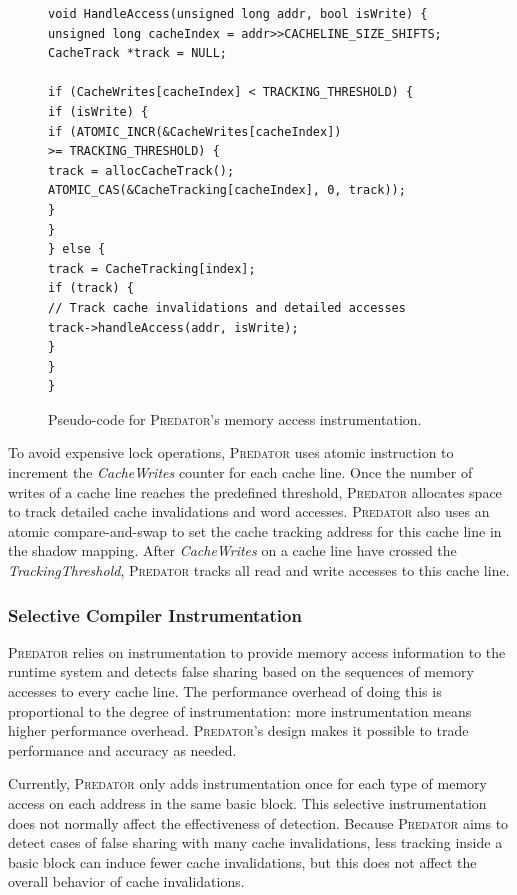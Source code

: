 \documentclass[10pt]{sigplanconf}
\newcommand{\Predator}{{\scshape Predator}}
\begin{document}
\begin{figure}[!t]
\begin{lstlisting}
void HandleAccess(unsigned long addr, bool isWrite) {
unsigned long cacheIndex = addr>>CACHELINE_SIZE_SHIFTS;
CacheTrack *track = NULL;

if (CacheWrites[cacheIndex] < TRACKING_THRESHOLD) {
if (isWrite) {
if (ATOMIC_INCR(&CacheWrites[cacheIndex]) 
>= TRACKING_THRESHOLD) {
track = allocCacheTrack();
ATOMIC_CAS(&CacheTracking[cacheIndex], 0, track));
}
} 
} else {
track = CacheTracking[index];
if (track) {
// Track cache invalidations and detailed accesses
track->handleAccess(addr, isWrite);
}
}
}
\end{lstlisting}
\caption{Pseudo-code for \Predator{}'s memory access instrumentation.\label{fig:algorithm}}
\end{figure}

To avoid expensive lock operations, \Predator{} uses atomic instruction to increment 
the {\it CacheWrites} counter for each cache line. 
Once the number of writes of a cache line reaches the predefined threshold,
\Predator{} allocates space to track detailed cache invalidations and word accesses.
\Predator{} also 
uses an atomic compare-and-swap to set the cache tracking address for this cache line in
the shadow mapping.
After {\it CacheWrites} on a cache line have crossed the {\it TrackingThreshold}, 
\Predator{} tracks all read and write accesses to this cache line.

\subsubsection{Selective Compiler Instrumentation}
\label{sec:selectinstrumentation}

\Predator{} relies on instrumentation to provide memory access information to the runtime system 
and detects false sharing based on the sequences of memory accesses to every cache line. 
The performance overhead of doing this is proportional to 
the degree of instrumentation: more 
instrumentation means higher performance overhead. \Predator{}'s design makes it possible to trade performance and accuracy as needed.

Currently, \Predator{} only adds instrumentation once for each type of memory access on each address 
in the same basic block. 
This selective instrumentation does not normally affect the effectiveness of detection. 
Because \Predator{} aims to detect cases of false sharing with many cache invalidations,
less tracking inside a basic block can induce fewer cache invalidations, 
but this does not affect the overall behavior of cache invalidations. 
\end{document}

